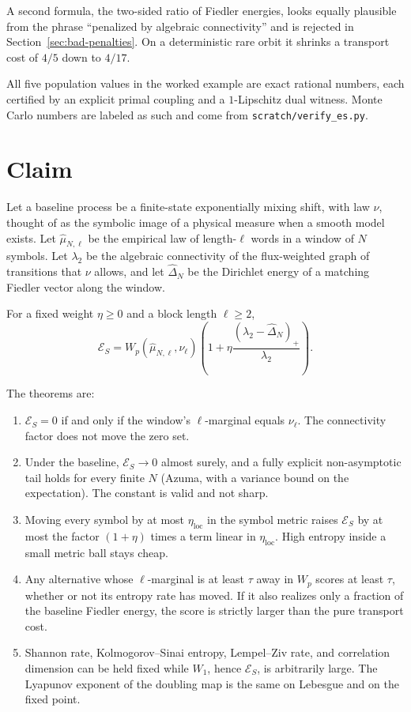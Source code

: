\documentclass[11pt,reqno]{amsart}
\theoremstyle{remark}
\newcommand{\ES}{\mathcal{E}_S}
\newcommand{\loc}{\mathrm{loc}}
\begin{document}
A second formula, the two-sided ratio of Fiedler energies, looks equally plausible from the phrase ``penalized by algebraic connectivity'' and is rejected in Section~\ref{sec:bad-penalties}. On a deterministic rare orbit it shrinks a transport cost of $4/5$ down to $4/17$.

All five population values in the worked example are exact rational numbers, each certified by an explicit primal coupling and a $1$-Lipschitz dual witness. Monte Carlo numbers are labeled as such and come from \texttt{scratch/verify\_es.py}.

\section{Claim}\label{sec:claim}

Let a baseline process be a finite-state exponentially mixing shift, with law $\nu$, thought of as the symbolic image of a physical measure when a smooth model exists. Let $\hat\mu_{N,\ell}$ be the empirical law of length-$\ell$ words in a window of $N$ symbols. Let $\lambda_2$ be the algebraic connectivity of the flux-weighted graph of transitions that $\nu$ allows, and let $\hat\Delta_N$ be the Dirichlet energy of a matching Fiedler vector along the window.

For a fixed weight $\eta \ge 0$ and a block length $\ell \ge 2$,
\begin{equation}\label{eq:es-def}
\ES
=
W_p(\hat\mu_{N,\ell}, \nu_\ell)
\left(
1 + \eta \frac{(\lambda_2 - \hat\Delta_N)_+}{\lambda_2}
\right).
\end{equation}

The theorems are:
\begin{enumerate}
\item $\ES = 0$ if and only if the window's $\ell$-marginal equals $\nu_\ell$. The connectivity factor does not move the zero set.
\item Under the baseline, $\ES \to 0$ almost surely, and a fully explicit non-asymptotic tail holds for every finite $N$ (Azuma, with a variance bound on the expectation). The constant is valid and not sharp.
\item Moving every symbol by at most $\eta_{\loc}$ in the symbol metric raises $\ES$ by at most the factor $(1+\eta)$ times a term linear in $\eta_{\loc}$. High entropy inside a small metric ball stays cheap.
\item Any alternative whose $\ell$-marginal is at least $\tau$ away in $W_p$ scores at least $\tau$, whether or not its entropy rate has moved. If it also realizes only a fraction of the baseline Fiedler energy, the score is strictly larger than the pure transport cost.
\item Shannon rate, Kolmogorov--Sinai entropy, Lempel--Ziv rate, and correlation dimension can be held fixed while $W_1$, hence $\ES$, is arbitrarily large. The Lyapunov exponent of the doubling map is the same on Lebesgue and on the fixed point.
\end{enumerate}
\end{document}
